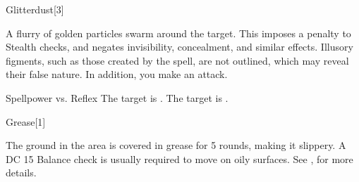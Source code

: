 \begin{spellsection}{Glitterdust}[3]
    \begin{spellheader}
    \end{spellheader}
    \begin{spellcontent}
        \begin{spelltargetinginfo}
        \end{spelltargetinginfo}
        \begin{spelleffects}
            \spelleffect A flurry of golden particles swarm around the target. This imposes a  penalty to Stealth checks, and negates invisibility, concealment, and similar effects. Illusory figments, such as those created by the  spell, are not outlined, which may reveal their false nature. In addition, you make an attack.
            \begin{spellattack}{Spellpower vs. Reflex}
                \spellsuccess The target is \partiallyblinded.
                \spellcritical The target is \blinded.
            \end{spellattack}
            \spelldur \durbrief
        \end{spelleffects}
    \end{spellcontent}
    \begin{spellfooter}
        \miscastyou
    \end{spellfooter}
\end{spellsection}

\begin{spellsection}{Grease}[1]
    \begin{spellheader}
    \end{spellheader}
    \begin{spellcontent}
        \begin{spelltargetinginfo}
        \end{spelltargetinginfo}
        \begin{spelleffects}
            \spelleffect The ground in the area is covered in grease for 5 rounds, making it slippery. A DC 15 Balance check is usually required to move on oily surfaces. See , for more details.
        \end{spelleffects}
    \end{spellcontent}
    \begin{spellfooter}
        \spellnotes \physicalspellnotes
        \miscastyou
    \end{spellfooter}
\end{spellsection}

